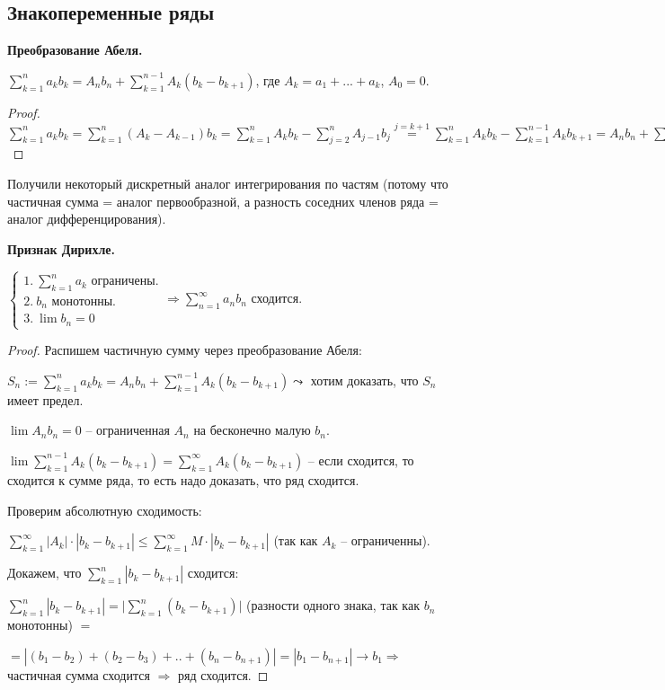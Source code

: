 \subsection{Знакопеременные ряды} 
\begin{theorem}
    \textbf{Преобразование Абеля.}
    
    $\sum\limits_{k=1}^na_kb_k=A_nb_n+\sum\limits_{k=1}^{n-1}A_k(b_k-b_{k+1})$, где $A_k=a_1+...+a_k$, $A_0=0$.
\end{theorem}

\begin{proof}
    $\sum\limits_{k=1}^na_kb_k=\sum\limits_{k=1}^n(A_k-A_{k-1})b_k=\sum\limits_{k=1}^nA_kb_k-\sum\limits_{j=2}^nA_{j-1}b_j\overset{j=k+1}{=}\sum\limits_{k=1}^nA_kb_k-\sum\limits_{k=1}^{n-1}A_{k}b_{k+1}=A_nb_n+\sum\limits_{k=1}^{n-1}A_k(b_k-b_{k+1})$
\end{proof}

\begin{remark}
    Получили некоторый дискретный аналог интегрирования по частям (потому что частичная сумма = аналог первообразной, а разность соседних членов ряда = аналог дифференцирования).
\end{remark}

\begin{theorem}
    \textbf{Признак Дирихле.}
    
    $\left \{\begin{array}{l}
        1.\ \sum\limits_{k=1}^na_k\text{ ограничены.} \\
        2.\ b_n\text{ монотонны.} \\
        3.\ \lim b_n=0 
    \end{array}\right.\Rightarrow \sum\limits_{n=1}^\infty a_nb_n$ сходится.
\end{theorem}

\begin{proof}
    Распишем частичную сумму через преобразование Абеля:
    
    $S_n:=\sum\limits_{k=1}^na_k b_k=A_nb_n+\sum\limits_{k=1}^{n-1}A_k(b_k-b_{k+1})\leadsto$ хотим доказать, что $S_n$ имеет предел.
    
    $\lim A_n b_n=0$ – ограниченная $A_n$ на бесконечно малую $b_n$.
    
    $\lim \sum\limits_{k=1}^{n-1}A_k(b_k-b_{k+1})=\sum\limits_{k=1}^\infty A_k(b_k-b_{k+1})$ – если сходится, то сходится к сумме ряда, то есть надо доказать, что ряд сходится. 
    
    Проверим абсолютную сходимость: 
    
    $\sum\limits_{k=1}^\infty|A_k|\cdot|b_k-b_{k+1}|\leq\sum\limits_{k=1}^\infty M\cdot |b_k-b_{k+1}|$ (так как $A_k$ – ограниченны). 
    
    Докажем, что $\sum\limits_{k=1}^n |b_k-b_{k+1}|$ сходится:

    $\sum\limits_{k=1}^n |b_k-b_{k+1}|=\bigg|\sum\limits_{k=1}^n (b_k-b_{k+1})\bigg|$ (разности одного знака, так как $b_n$ монотонны) $=$
    
    $=|(b_1-b_2)+(b_2-b_3)+..+(b_n-{b_{n+1}})|=|b_1-b_{n+1}|\rightarrow b_1\Rightarrow $ частичная сумма сходится $\Rightarrow$ ряд сходится.  
\end{proof}

